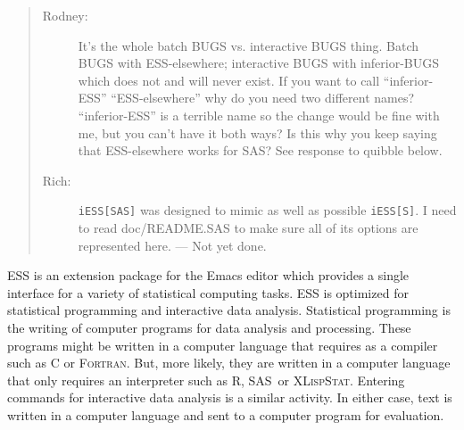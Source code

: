 \documentclass{article}
\newcommand*{\SAS}{\textsc{SAS}}
\newcommand*{\XLispStat}{\textsc{XLispStat}}
\newcommand*{\Fortran}{\textsc{Fortran}}
\newcommand{\stexttt}[1]{{\small\texttt{#1}}}
\newenvironment{Comment}{\begin{quote}\small\itshape }{\end{quote}}
\begin{document}
\begin{Comment}
\begin{description}
\item[Rodney:] It's the whole batch BUGS vs. interactive BUGS thing.  Batch 
BUGS with ESS-elsewhere; interactive BUGS with inferior-BUGS which does not 
and will never exist.  If you want to call ``inferior-ESS'' ``ESS-elsewhere'' 
why do you need two different names?  ``inferior-ESS'' is a terrible name
so the change would be fine with me, but you can't have it both ways?  Is
this why you keep saying that ESS-elsewhere works for SAS?  See 
response to quibble below.

\item[Rich:]
\stexttt{iESS[SAS]} was designed to mimic as well as possible \stexttt{iESS[S]}.
I need to read doc/README.SAS to make sure all of its options are represented
here. --- Not yet done.
\end{description}
\end{Comment}

ESS is an extension package for
the Emacs editor which provides a single interface for a variety of
statistical computing tasks.  ESS is optimized for statistical programming
and interactive data analysis.  Statistical programming is the writing of
computer programs for data analysis and processing.  These programs might be
written in a computer language that requires as a compiler such as C or
\Fortran.  But, more likely, they are written in a  computer
language that only requires an interpreter such as R, \SAS\ or \XLispStat.
Entering commands for interactive data analysis is a similar activity.
In either case, text is written in a computer language and sent to a
computer program for evaluation.
\end{document}
